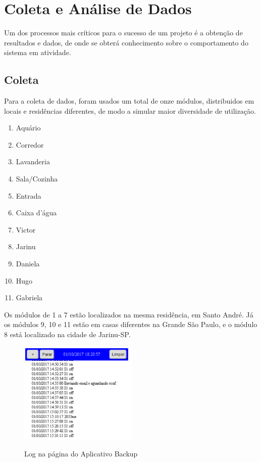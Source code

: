 \chapter{Coleta e Análise de Dados}

Um dos processos mais críticos para o sucesso de um projeto é a obtenção de resultados e dados, de onde se obterá conhecimento sobre o comportamento do sistema em atividade.

\section{Coleta}

Para a coleta de dados, foram usados um total de onze módulos, distribuidos em locais e residências diferentes, de modo a simular maior diversidade de utilização.

\begin{enumerate}
	\item Aquário
	\item Corredor
	\item Lavanderia
	\item Sala/Cozinha
	\item Entrada
	\item Caixa d’água
	\item Victor
	\item Jarinu
	\item Daniela
	\item Hugo
	\item Gabriela
\end{enumerate}

Os módulos de 1 a 7 estão localizados na mesma residência, em Santo André. Já os módulos 9, 10 e 11 estão em casas diferentes na Grande São Paulo, e o módulo 8 está localizado na cidade de Jarinu-SP.

\begin{figure}[H]
	\centering
	\caption{Log na página do Aplicativo Backup}
	\includegraphics[width=0.5\textwidth]{logAppBackup}
	\label{fig:logAppBackup}
\end{figure}

